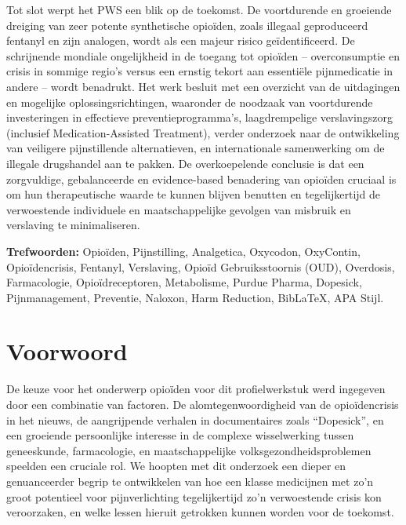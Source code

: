 \documentclass[11pt, a4paper]{report} %
\begin{document}
Tot slot werpt het PWS een blik op de toekomst. De voortdurende en groeiende dreiging van zeer potente synthetische opioïden, zoals illegaal geproduceerd fentanyl en zijn analogen, wordt als een majeur risico geïdentificeerd. De schrijnende mondiale ongelijkheid in de toegang tot opioïden – overconsumptie en crisis in sommige regio's versus een ernstig tekort aan essentiële pijnmedicatie in andere – wordt benadrukt. Het werk besluit met een overzicht van de uitdagingen en mogelijke oplossingsrichtingen, waaronder de noodzaak van voortdurende investeringen in effectieve preventieprogramma's, laagdrempelige verslavingszorg (inclusief Medication-Assisted Treatment), verder onderzoek naar de ontwikkeling van veiligere pijnstillende alternatieven, en internationale samenwerking om de illegale drugshandel aan te pakken. De overkoepelende conclusie is dat een zorgvuldige, gebalanceerde en evidence-based benadering van opioïden cruciaal is om hun therapeutische waarde te kunnen blijven benutten en tegelijkertijd de verwoestende individuele en maatschappelijke gevolgen van misbruik en verslaving te minimaliseren.

\vspace{2cm} %
\textbf{Trefwoorden:} Opioïden, Pijnstilling, Analgetica, Oxycodon, OxyContin, Opioïdencrisis, Fentanyl, Verslaving, Opioïd Gebruiksstoornis (OUD), Overdosis, Farmacologie, Opioïdreceptoren, Metabolisme, Purdue Pharma, Dopesick, Pijnmanagement, Preventie, Naloxon, Harm Reduction, BibLaTeX, APA Stijl.

\chapter*{Voorwoord}

De keuze voor het onderwerp opioïden voor dit profielwerkstuk werd ingegeven door een combinatie van factoren. De alomtegenwoordigheid van de opioïdencrisis in het nieuws, de aangrijpende verhalen in documentaires zoals \enquote{Dopesick}, en een groeiende persoonlijke interesse in de complexe wisselwerking tussen geneeskunde, farmacologie, en maatschappelijke volksgezondheidsproblemen speelden een cruciale rol. We hoopten met dit onderzoek een dieper en genuanceerder begrip te ontwikkelen van hoe een klasse medicijnen met zo'n groot potentieel voor pijnverlichting tegelijkertijd zo'n verwoestende crisis kon veroorzaken, en welke lessen hieruit getrokken kunnen worden voor de toekomst.
\end{document}

